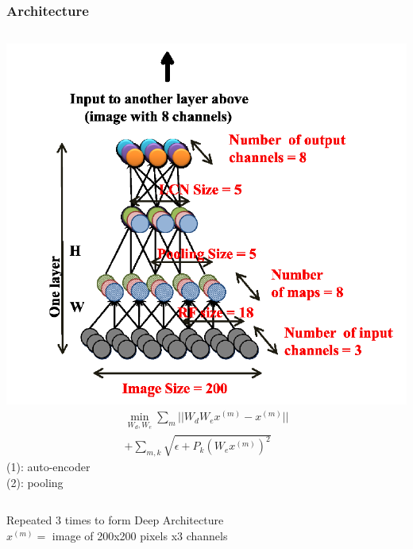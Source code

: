 \documentclass{beamer}
\begin{document}
\begin{frame}
\frametitle{Architecture}
\begin{columns}[c]
	\includegraphics[scale=0.25]{figs/le12architecture}
	\begin{eqnarray}
	\min_{W_d,W_e} \sum_m ||W_d W_e x^{(m)} - x^{(m)} ||  \\
	+ \sum_{m,k} \sqrt{\epsilon + P_k (W_e x^{(m)})^2}  
	\end{eqnarray}
	\hspace{2cm} (1): auto-encoder \\
	\hspace{2cm} (2): pooling
\end{columns}
Repeated 3 times to form Deep Architecture\\
$x^{(m)}=$ image of 200x200 pixels x3 channels
\end{frame}
\end{document}
